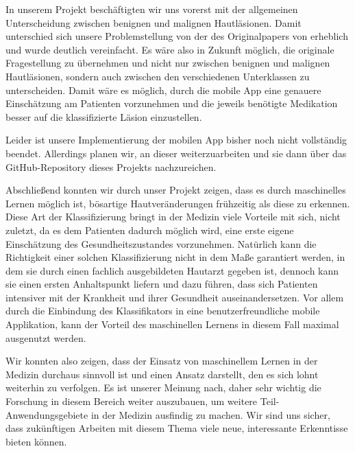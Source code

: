 In unserem Projekt beschäftigten wir uns vorerst mit der allgemeinen Unterscheidung zwischen benignen und malignen Hautläsionen. Damit unterschied sich unsere Problemstellung von der des Originalpapers von \citet{esteva2017dermatologist} erheblich und wurde deutlich vereinfacht. Es wäre also in Zukunft möglich, die originale Fragestellung zu übernehmen und nicht nur zwischen benignen und malignen Hautläsionen, sondern auch zwischen den verschiedenen Unterklassen zu unterscheiden. Damit wäre es möglich, durch die mobile App eine genauere Einschätzung am Patienten vorzunehmen und die jeweils benötigte Medikation besser auf die klassifizierte Läsion einzustellen.

Leider ist unsere Implementierung der mobilen App bisher noch nicht vollständig beendet. Allerdings planen wir, an dieser weiterzuarbeiten und sie dann über das GitHub-Repository dieses Projekts nachzureichen.  

Abschließend konnten wir durch unser Projekt zeigen, dass es durch maschinelles Lernen möglich ist, bösartige Hautveränderungen frühzeitig als diese zu erkennen. Diese Art der Klassifizierung bringt in der Medizin viele Vorteile mit sich, nicht zuletzt, da es dem Patienten dadurch möglich wird, eine erste eigene Einschätzung des Gesundheitszustandes vorzunehmen. Natürlich kann die Richtigkeit einer solchen Klassifizierung nicht in dem Maße garantiert werden, in dem sie durch einen fachlich ausgebildeten Hautarzt gegeben ist, dennoch kann sie einen ersten Anhaltspunkt liefern und dazu führen, dass sich Patienten intensiver mit der Krankheit und ihrer Gesundheit auseinandersetzen. Vor allem durch die Einbindung des Klassifikators in eine benutzerfreundliche mobile Applikation, kann der Vorteil des maschinellen Lernens in diesem Fall maximal ausgenutzt werden.

Wir konnten also zeigen, dass der Einsatz von maschinellem Lernen in der Medizin durchaus sinnvoll ist und einen Ansatz darstellt, den es sich lohnt weiterhin zu verfolgen. Es ist unserer Meinung nach, daher sehr wichtig die Forschung in diesem Bereich weiter auszubauen, um weitere Teil-Anwendungsgebiete in der Medizin ausfindig zu machen. Wir sind uns sicher, dass zukünftigen Arbeiten mit diesem Thema viele neue, interessante Erkenntisse bieten können.    